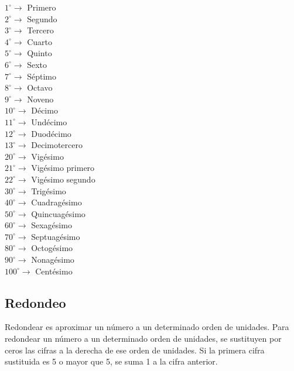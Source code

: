 \begin{center}
    \begin{multicols}{3}
        $1^{\circ} \rightarrow$ Primero \\
        $2^{\circ} \rightarrow$ Segundo \\
        $3^{\circ} \rightarrow$ Tercero \\
        $4^{\circ} \rightarrow$ Cuarto \\
        $5^{\circ} \rightarrow$ Quinto \\
        $6^{\circ} \rightarrow$ Sexto \\
        $7^{\circ} \rightarrow$ Séptimo \\
        $8^{\circ} \rightarrow$ Octavo \\
        $9^{\circ} \rightarrow$ Noveno \\
        $10^{\circ} \rightarrow$ Décimo \\
        $11^{\circ} \rightarrow$ Undécimo \\
        $12^{\circ} \rightarrow$ Duodécimo \\
        $13^{\circ} \rightarrow$ Decimotercero \\
        $20^{\circ} \rightarrow$ Vigésimo \\
        $21^{\circ} \rightarrow$ Vigésimo primero \\
        $22^{\circ} \rightarrow$ Vigésimo segundo \\
        $30^{\circ} \rightarrow$ Trigésimo \\
        $40^{\circ} \rightarrow$ Cuadragésimo \\
        $50^{\circ} \rightarrow$ Quincuagésimo \\
        $60^{\circ} \rightarrow$ Sexagésimo \\
        $70^{\circ} \rightarrow$ Septuagésimo \\
        $80^{\circ} \rightarrow$ Octogésimo \\
        $90^{\circ} \rightarrow$ Nonagésimo \\
        $100^{\circ} \rightarrow$ Centésimo
    \end{multicols}
\end{center}

\subsection{Redondeo}

Redondear es aproximar un número a un determinado orden de unidades. Para redondear un número a un determinado orden de unidades, se sustituyen por ceros las cifras a la derecha de ese orden de unidades. Si la primera cifra sustituida es 5 o mayor que 5, se suma 1 a la cifra anterior.

